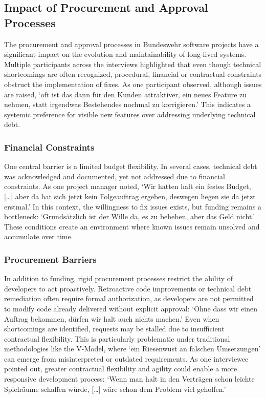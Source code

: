 \subsection{Impact of Procurement and Approval Processes}
The procurement and approval processes in Bundeswehr software projects have a significant impact on the evolution and maintainability of long-lived systems. Multiple participants across the interviews highlighted that even though technical shortcomings are often recognized, 
procedural, financial or contractual constraints obstruct the implementation of fixes. As one participant observed, although issues are raised, `oft ist das dann für den Kunden attraktiver, ein neues Feature zu nehmen, statt irgendwas Bestehendes nochmal zu korrigieren.'
This indicates a systemic preference for visible new features over addressing underlying technical debt.

\subsubsection{Financial Constraints}
One central barrier is a limited budget flexibility. In several cases, technical debt was acknowledged and documented, yet not addressed due to financial constraints. As one project manager noted, `Wir hatten halt ein festes Budget, [\ldots] aber da hat sich jetzt kein Folgeauftrag ergeben, deswegen liegen sie da jetzt erstmal.'
In this context, the willingness to fix issues exists, but funding remains a bottleneck: `Grundsätzlich ist der Wille da, es zu beheben, aber das Geld nicht.' These conditions create an environment where known issues remain unsolved and accumulate over time.

\subsubsection{Procurement Barriers}
In addition to funding, rigid procurement processes restrict the ability of developers to act proactively. Retroactive code improvements or technical debt remediation often require formal authorization, as developers are not permitted to modify code already delivered without explicit approval:
`Ohne dass wir einen Auftrag bekommen, dürfen wir halt auch nichts machen.' Even when shortcomings are identified, requests may be stalled due to insufficient contractual flexibility. This is particularly problematic under traditional methodologies like the V-Model, where
`ein Riesenwust an falschen Umsetzungen' can emerge from misinterpreted or outdated requirements. As one interviewee pointed out, greater contractual flexibility and agility could enable a more responsive development process:
`Wenn man halt in den Verträgen schon leichte Spielräume schaffen würde, [\ldots] wäre schon dem Problem viel geholfen.'\\

